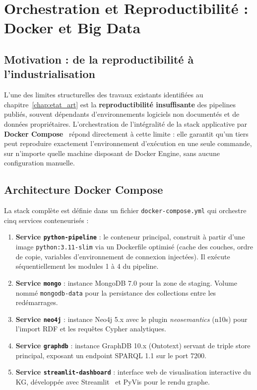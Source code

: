 \section{Orchestration et Reproductibilité : Docker et Big Data}
\label{sec:docker}

\subsection{Motivation : de la reproductibilité à l'industrialisation}

L'une des limites structurelles des travaux existants identifiées au
chapitre~\ref{chap:etat_art} est la \textbf{reproductibilité insuffisante} des
pipelines publiés, souvent dépendants d'environnements logiciels non documentés
et de données propriétaires.
L'orchestration de l'intégralité de la stack applicative par
\textbf{Docker Compose}~\cite{docker2024} répond directement à cette limite :
elle garantit qu'un tiers peut reproduire exactement l'environnement d'exécution
en une seule commande, sur n'importe quelle machine disposant de Docker Engine,
sans aucune configuration manuelle.

\subsection{Architecture Docker Compose}

La stack complète est définie dans un fichier \texttt{docker-compose.yml}
qui orchestre cinq services conteneurisés :

\begin{enumerate}
    \item \textbf{Service \texttt{python-pipeline}} : le conteneur principal,
          construit à partir d'une image \texttt{python:3.11-slim} via un
          Dockerfile optimisé (cache des couches, ordre de copie, variables
          d'environnement de connexion injectées).
          Il exécute séquentiellement les modules 1 à 4 du pipeline.
    \item \textbf{Service \texttt{mongo}} : instance MongoDB 7.0 pour la zone
          de staging.
          Volume nommé \texttt{mongodb-data} pour la persistance des collections
          entre les redémarrages.
    \item \textbf{Service \texttt{neo4j}} : instance Neo4j 5.x avec le plugin
          \textit{neosemantics} (n10s) pour l'import RDF et les requêtes Cypher
          analytiques.
    \item \textbf{Service \texttt{graphdb}} : instance GraphDB 10.x (Ontotext)
          servant de triple store principal, exposant un endpoint SPARQL 1.1
          sur le port 7200.
    \item \textbf{Service \texttt{streamlit-dashboard}} : interface web de
          visualisation interactive du KG, développée avec
          Streamlit~\cite{streamlit2023} et PyVis pour le rendu graphe.
\end{enumerate}

